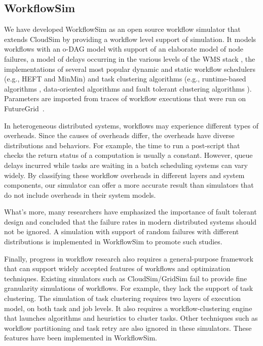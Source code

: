 \subsection{WorkflowSim}

We have developed WorkflowSim as an open source workflow simulator that extends CloudSim \cite{Calheiros2011} by providing a workflow level support of simulation. It models workflows with an o-DAG model with support of an elaborate model of node failures, a model of delays occurring in the various levels of the WMS stack \cite{Chen2011}, the implementations of several most popular dynamic and static workflow schedulers (e.g., HEFT\cite{Topcuoglu2002} and MinMin\cite{Blythe2005}) and task clustering algorithms (e.g., runtime-based algorithms \cite{Chen2013b}, data-oriented algorithms \cite{Chen2013b} and fault tolerant clustering algorithms \cite{Chen2012}). Parameters are imported from traces of workflow executions that were run on FutureGrid~\cite{Fox2013FutureGrid}. 

In heterogeneous distributed systems, workflows may experience different types of overheads.  Since the causes of overheads differ, the overheads have diverse distributions and behaviors. For example, the time to run a post-script that checks the return status of a computation is usually a constant. However, queue delays incurred while tasks are waiting in a batch scheduling systems can vary widely. 
By classifying these workflow overheads in different layers and system components, our simulator can offer a more accurate result than simulators that do not include overheads in their system models.

What’s more, many researchers \cite{Zhang2004, Tang1990, Schroeder2006, Sahoo2004, Oppenheimer2002, McConnel1979} have emphasized the importance of fault tolerant design and concluded that the failure rates in modern distributed systems should not be ignored. A simulation with support of random failures with different distributions is implemented in WorkflowSim to promote such studies. 

Finally, progress in workflow research also requires a general-purpose framework that can support widely accepted features of workflows and optimization techniques. Existing simulators such as CloudSim/GridSim \cite{Calheiros2011} fail to provide fine granularity simulations of workflows. For example, they lack the support of task clustering. The simulation of task clustering requires two layers of execution model, on both task and job levels. It also requires a workflow-clustering engine that launches algorithms and heuristics to cluster tasks. Other techniques such as workflow partitioning and task retry are also ignored in these simulators. These features have been implemented in WorkflowSim. 

